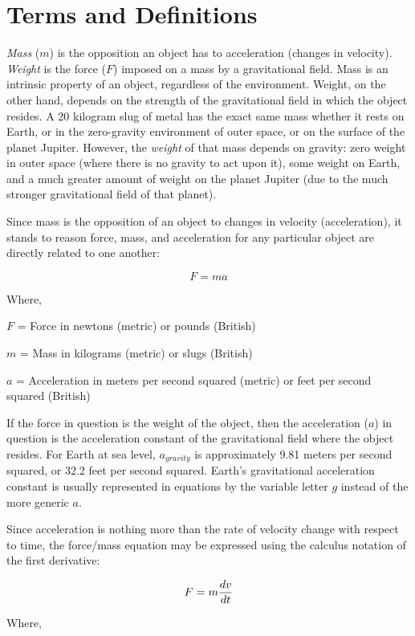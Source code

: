 \filbreak
\section{Terms and Definitions}

\textit{Mass} ($m$) is the opposition an object has to acceleration (changes in velocity).  \textit{Weight} is the force ($F$) imposed on a mass by a gravitational field.  Mass is an intrinsic property of an object, regardless of the environment.  Weight, on the other hand, depends on the strength of the gravitational field in which the object resides.  A 20 kilogram slug of metal has the exact same mass whether it rests on Earth, or in the zero-gravity environment of outer space, or on the surface of the planet Jupiter.  However, the \textit{weight} of that mass depends on gravity: zero weight in outer space (where there is no gravity to act upon it), some weight on Earth, and a much greater amount of weight on the planet Jupiter (due to the much stronger gravitational field of that planet).

Since mass is the opposition of an object to changes in velocity (acceleration), it stands to reason force, mass, and acceleration for any particular object are directly related to one another:

$$F = ma$$

\noindent
Where,

$F$ = Force in newtons (metric) or pounds (British)

$m$ = Mass in kilograms (metric) or slugs (British)

$a$ = Acceleration in meters per second squared (metric) or feet per second squared (British)

\vskip 10pt

If the force in question is the weight of the object, then the acceleration ($a$) in question is the acceleration constant of the gravitational field where the object resides.  For Earth at sea level, $a_{gravity}$ is approximately 9.81 meters per second squared, or 32.2 feet per second squared.  Earth's gravitational acceleration constant is usually represented in equations by the variable letter $g$ instead of the more generic $a$.

Since acceleration is nothing more than the rate of velocity change with respect to time, the force/mass equation may be expressed using the calculus notation of the first derivative:

$$F = m{dv \over dt}$$

\noindent
Where,

